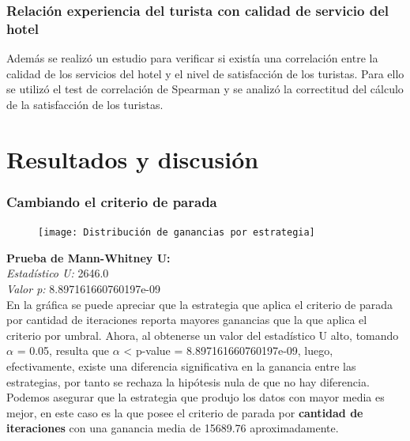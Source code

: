 \documentclass[12pt,a4paper]{article} \usepackage[spanish]{babel} \usepackage{graphicx} \usepackage{amsmath} \usepackage{amsfonts} \usepackage{amssymb} \usepackage{float} \usepackage{geometry}
\begin{document}
\subsubsection{Relación experiencia del turista con calidad de servicio del hotel}
Además se realizó un estudio para verificar si existía una correlación entre la calidad de los servicios del hotel y el nivel de satisfacción de los turistas. Para ello se utilizó el test de correlación de Spearman y se analizó la correctitud del cálculo de la satisfacción de los turistas.


\section{Resultados y discusión}


\subsubsection{Cambiando el criterio de parada}

\begin{figure}[H] \centering \texttt{[image: Distribución de ganancias por estrategia]} \caption{} \label{fig:etiqueta} \end{figure}
\textbf{Prueba de Mann-Whitney U:}\\
\textit{Estadístico U:} 2646.0\\
\textit{Valor p:} 8.897161660760197e-09\\
En la gráfica se puede apreciar que la estrategia que aplica el criterio de parada por cantidad de iteraciones reporta mayores ganancias que la que aplica el criterio por umbral. Ahora, al obtenerse un valor del estadístico U alto, tomando $\alpha$ = 0.05, resulta que $\alpha$ < p-value = 8.897161660760197e-09, luego, efectivamente, existe una diferencia significativa en la ganancia entre las estrategias, por tanto se rechaza la hipótesis nula de que no hay diferencia. Podemos asegurar que la estrategia que produjo los datos con mayor media es mejor, en este caso es la que posee el criterio de parada por \textbf{cantidad de iteraciones} con una ganancia media de 15689.76 aproximadamente.
\end{document}
